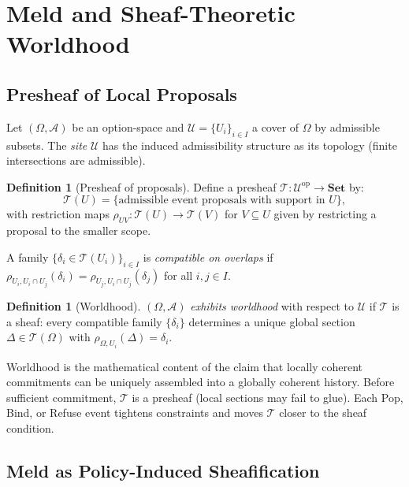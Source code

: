 \documentclass[12pt,a4paper]{article}
\theoremstyle{definition}
\newtheorem{definition}[theorem]{Definition}
\theoremstyle{remark}
\begin{document}
\section{Meld and Sheaf-Theoretic Worldhood}
\label{sec:sheaf}

\subsection{Presheaf of Local Proposals}

Let $(\Omega,\mathcal{A})$ be an option-space and $\mathcal{U}=\{U_i\}_{i\in I}$ a
cover of $\Omega$ by admissible subsets. The \emph{site} $\mathcal{U}$ has the
induced admissibility structure as its topology (finite intersections are admissible).

\begin{definition}[Presheaf of proposals]
\label{def:presheaf}
Define a presheaf $\mathcal{T}:\mathcal{U}^{\mathrm{op}}\to\mathbf{Set}$ by:
\[
  \mathcal{T}(U) = \{\text{admissible event proposals with support in }U\},
\]
with restriction maps $\rho_{UV}:\mathcal{T}(U)\to\mathcal{T}(V)$ for $V\subseteq U$
given by restricting a proposal to the smaller scope.
\end{definition}

A family $\{\delta_i\in\mathcal{T}(U_i)\}_{i\in I}$ is \emph{compatible on overlaps}
if $\rho_{U_i,U_i\cap U_j}(\delta_i)=\rho_{U_j,U_i\cap U_j}(\delta_j)$ for all
$i,j\in I$.

\begin{definition}[Worldhood]
\label{def:worldhood}
$(\Omega,\mathcal{A})$ \emph{exhibits worldhood} with respect to $\mathcal{U}$ if
$\mathcal{T}$ is a sheaf: every compatible family $\{\delta_i\}$ determines a unique
global section $\Delta\in\mathcal{T}(\Omega)$ with $\rho_{\Omega,U_i}(\Delta)=\delta_i$.
\end{definition}

Worldhood is the mathematical content of the claim that locally coherent commitments
can be uniquely assembled into a globally coherent history. Before sufficient
commitment, $\mathcal{T}$ is a presheaf (local sections may fail to glue). Each
Pop, Bind, or Refuse event tightens constraints and moves $\mathcal{T}$ closer to the
sheaf condition.

\subsection{Meld as Policy-Induced Sheafification}
\end{document}
